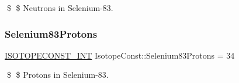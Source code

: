 \$ \$ Neutrons in Selenium-\/83. \mbox{\label{group___isotope_const-_selenium-_se83_ga5a88badc02eb6f6e29a8728022907545}} 
\subsubsection{\texorpdfstring{Selenium83\+Protons}{Selenium83Protons}}
{\footnotesize\ttfamily \mbox{\hyperlink{group___isotope_const-_macros_ga5f18360b3e99483a35c32d789e62621c}{I\+S\+O\+T\+O\+P\+E\+C\+O\+N\+S\+T\+\_\+\+I\+NT}} Isotope\+Const\+::\+Selenium83\+Protons = 34}

\$ \$ Protons in Selenium-\/83. 